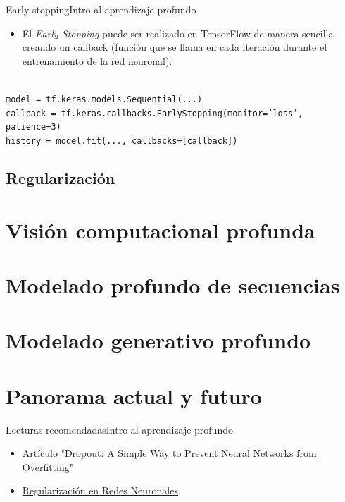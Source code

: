 \documentclass[10pt,border=3pt,tikz]{beamer}
\begin{document}
    \begin{frame}{Early stopping}{Intro al aprendizaje profundo}
        \begin{itemize}
            \item El \textit{Early Stopping} puede ser realizado en TensorFlow de manera sencilla creando un callback (función que se llama en cada iteración durante el entrenamiento de la red neuronal):\\
        \end{itemize}
        
        \texttt{\\model = tf.keras.models.Sequential(...)}\\
        \texttt{callback = tf.keras.callbacks.EarlyStopping(monitor='loss', patience=3)}\\
        \texttt{history = model.fit(..., callbacks=[callback])}
    \end{frame}
    
    \subsection{Regularización}
    \section{Visión computacional profunda}
    \section{Modelado profundo de secuencias}
    \section{Modelado generativo profundo}
    \section{Panorama actual y futuro}
    
    \begin{frame}{Lecturas recomendadas}{Intro al aprendizaje profundo}
        \begin{itemize}
            \item Artículo \colorbox{blue!10}{\href{https://jmlr.org/papers/v15/srivastava14a.html}{"Dropout: A Simple Way to Prevent Neural Networks from Overfitting"}}
            \item \colorbox{blue!10}{\href{https://www.pinecone.io/learn/regularization-in-neural-networks/}{Regularización en Redes Neuronales}}
        \end{itemize}
    \end{frame}

	
\end{document}
